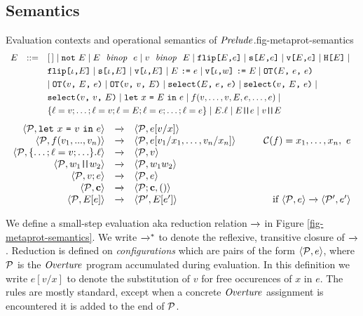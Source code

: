 \subsection{Semantics}

\begin{fpfig}[t]{Evaluation contexts and operational semantics of $\mathit{Prelude}$.}{fig-metaprot-semantics}
$$
\begin{array}{rcl@{\hspace{3mm}}r}
E &::=& [\,] \mid \enot\ E \mid E\ \bop\ e \mid v\ \bop\ E \mid  \flip{E}{e} \mid \secret{E}{e} \mid \view{E}{e} \mid \oracle{E} \mid  \\[1mm]
& & \flip{\cid}{E} \mid \secret{\cid}{E} \mid \view{\cid}{E} \mid \send{E}{e} \mid \send{\view{\cid}{w}}{E} \mid \OT{E}{e}{e} \\[1mm]
& & \mid \OT{v}{E}{e} \mid \OT{v}{v}{E} \mid \select{E}{e}{e} \mid \select{v}{E}{e} \mid \\[1mm]
& & \select{v}{v}{E} \mid \elet{x}{E}{e} \mid f(v,\ldots,v,E,e,\ldots,e) \mid \\[1mm]
& & \{ \flab = v;\ldots;\flab = v;\flab = E;\flab = e;\ldots;\flab = e \} \mid E.\flab \mid E\concat e \mid v \concat E
\end{array}
$$
\medskip
$$
\begin{array}{rcl@{\hspace{10mm}}r}
\config{\prog}{\elet{x}{v}{e}} &\redx& \config{\prog}{e[v/x]}\\
\config{\prog}{f(v_1,...,v_n)} &\redx&
\config{\prog}{e[v_1/x_1,\ldots,v_n/x_n]} & 
 \codebase(f) = x_1,\ldots,x_n,\ e\\
\config{\prog}{\{\ldots; \flab = v; \ldots\}.\flab} &\redx&
 \config{\prog}{v}\\
 \config{\prog}{w_1\concat w_2} &\redx& \config{\prog}{w_1w_2}\\
 \config{\prog}{v;e} &\redx& \config{\prog}{e}\\
\config{\prog}{\instr} &\redx& \config{\prog;\instr}{()}\\
\config{\prog}{E[e]} &\redx& \config{\prog'}{E[e']} & \text{if}\ \config{\prog}{e} \redx \config{\prog'}{e'} 
\end{array}
$$
\end{fpfig}

We define a small-step evaluation aka reduction relation $\xrightarrow{}$ in
Figure \ref{fig-metaprot-semantics}.  We write $\xrightarrow{}^{*}$ to denote the
reflexive, transitive closure of $\xrightarrow{}$. Reduction is defined on
\emph{configurations} which are pairs of the form $\langle \mathcal{P},e \rangle$,
where $\mathcal{P}$ is the $\mathit{Overture}$ program accumulated during evaluation.
In this definition we write $e[v/x]$ to denote the substitution of $v$
for free occurences of $x$ in $e$. The rules are mostly standard,
except when a concrete $\mathit{Overture}$ assignment is encountered it is added
to the end of $\mathcal{P}$.

